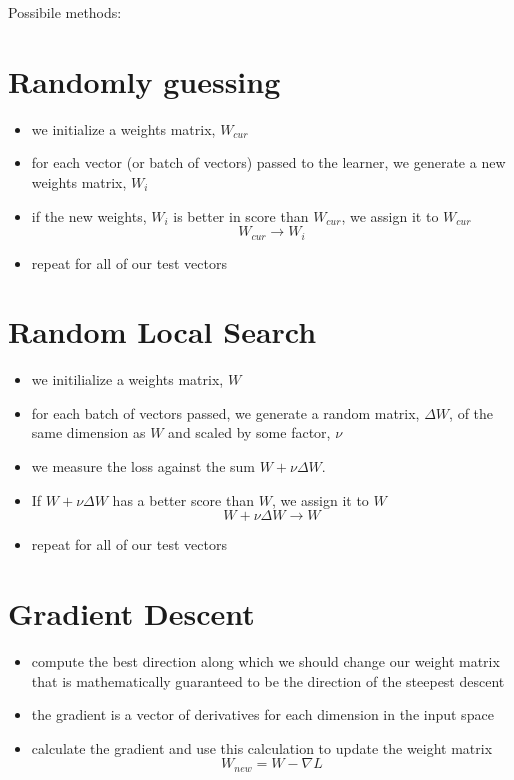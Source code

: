 \documentclass[]{report}
\begin{document}
Possibile methods:

\section{Randomly guessing}\label{randomly-guessing}

\begin{itemize}
\tightlist
\item
  we initialize a weights matrix, \(W_{cur}\)
\item
  for each vector (or batch of vectors) passed to the learner, we
  generate a new weights matrix, \(W_{i}\)
\item
  if the new weights, \(W_{i}\) is better in score than \(W_{cur}\), we
  assign it to \(W_{cur}\) \[W_{cur} \to W_i\]
\item
  repeat for all of our test vectors
\end{itemize}

\section{Random Local Search}\label{random-local-search}

\begin{itemize}
\tightlist
\item
  we initilialize a weights matrix, \(W\)
\item
  for each batch of vectors passed, we generate a random matrix,
  \(\Delta W\), of the same dimension as \(W\) and scaled by some
  factor, \(\nu\)
\item
  we measure the loss against the sum \(W+\nu\Delta W\).
\item
  If \(W + \nu\Delta W\) has a better score than \(W\), we assign it to
  \(W\) \[W + \nu\Delta W \to W\]
\item
  repeat for all of our test vectors
\end{itemize}

\section{Gradient Descent}\label{gradient-descent}

\begin{itemize}
\tightlist
\item
  compute the best direction along which we should change our weight
  matrix that is mathematically guaranteed to be the direction of the
  steepest descent
\item
  the gradient is a vector of derivatives for each dimension in the
  input space
\item
  calculate the gradient and use this calculation to update the weight
  matrix \[W_{new} = W - \nabla L\]
\end{itemize}
\end{document}
